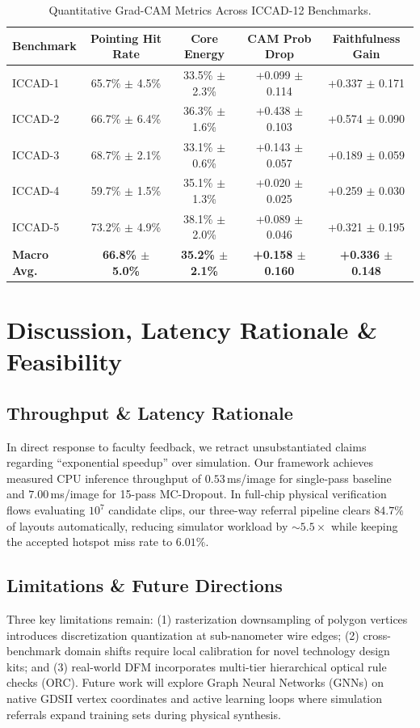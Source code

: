 \documentclass[11pt,journal,onecolumn]{IEEEtran}
\begin{document}
\begin{table}[htbp]
\caption{Quantitative Grad-CAM Metrics Across ICCAD-12 Benchmarks.}
\label{tab:gradcam}
\centering
\begin{tabular}{lcccc}
\toprule
\textbf{Benchmark} & \textbf{Pointing Hit Rate} & \textbf{Core Energy} & \textbf{CAM Prob Drop} & \textbf{Faithfulness Gain} \\
\midrule
ICCAD-1 & 65.7\% $\pm$ 4.5\% & 33.5\% $\pm$ 2.3\% & +0.099 $\pm$ 0.114 & +0.337 $\pm$ 0.171 \\
ICCAD-2 & 66.7\% $\pm$ 6.4\% & 36.3\% $\pm$ 1.6\% & +0.438 $\pm$ 0.103 & +0.574 $\pm$ 0.090 \\
ICCAD-3 & 68.7\% $\pm$ 2.1\% & 33.1\% $\pm$ 0.6\% & +0.143 $\pm$ 0.057 & +0.189 $\pm$ 0.059 \\
ICCAD-4 & 59.7\% $\pm$ 1.5\% & 35.1\% $\pm$ 1.3\% & +0.020 $\pm$ 0.025 & +0.259 $\pm$ 0.030 \\
ICCAD-5 & 73.2\% $\pm$ 4.9\% & 38.1\% $\pm$ 2.0\% & +0.089 $\pm$ 0.046 & +0.321 $\pm$ 0.195 \\
\midrule
\textbf{Macro Avg.} & \textbf{66.8\% $\pm$ 5.0\%} & \textbf{35.2\% $\pm$ 2.1\%} & \textbf{+0.158 $\pm$ 0.160} & \textbf{+0.336 $\pm$ 0.148} \\
\bottomrule
\end{tabular}
\end{table}

\section{Discussion, Latency Rationale \& Feasibility}

\subsection{Throughput \& Latency Rationale}
In direct response to faculty feedback, we retract unsubstantiated claims regarding ``exponential speedup'' over simulation. Our framework achieves measured CPU inference throughput of $0.53$\,ms/image for single-pass baseline and $7.00$\,ms/image for 15-pass MC-Dropout. In full-chip physical verification flows evaluating $10^7$ candidate clips, our three-way referral pipeline clears $84.7\%$ of layouts automatically, reducing simulator workload by $\sim 5.5\times$ while keeping the accepted hotspot miss rate to $6.01\%$.

\subsection{Limitations \& Future Directions}
Three key limitations remain: (1) rasterization downsampling of polygon vertices introduces discretization quantization at sub-nanometer wire edges; (2) cross-benchmark domain shifts require local calibration for novel technology design kits; and (3) real-world DFM incorporates multi-tier hierarchical optical rule checks (ORC). Future work will explore Graph Neural Networks (GNNs) on native GDSII vertex coordinates and active learning loops where simulation referrals expand training sets during physical synthesis.
\end{document}
